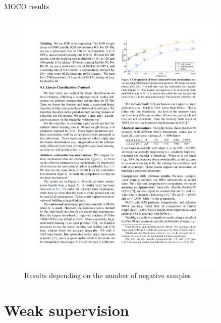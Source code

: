 \documentclass[xcolor=pdftex,dvipsnames,table]{beamer}
\begin{document}
\begin{frame}{MOCO results}
\begin{figure}[htb]
    \centering
    \includegraphics[width=0.9\textwidth]{../graphics/moco_results.pdf}
    \caption{Results depending on the number of negative samples \cite{He2020}}
 \end{figure}
\end{frame}




\section{Weak supervision}
\end{document}
